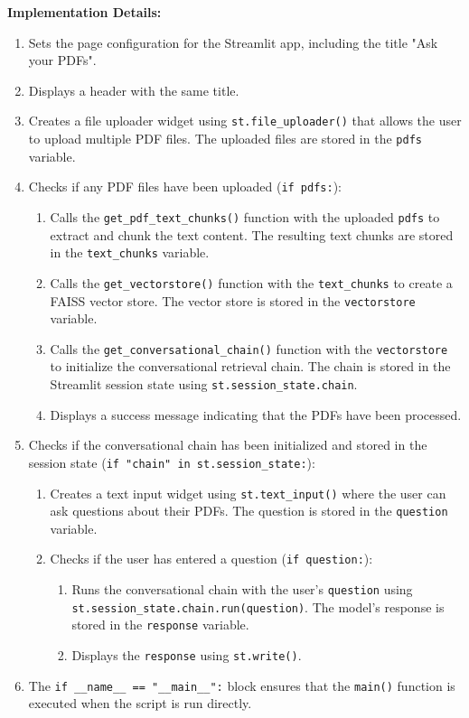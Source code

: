 \documentclass{article}
\begin{document}
\textbf{Implementation Details:}
\begin{enumerate}
    \item Sets the page configuration for the Streamlit app, including the title "Ask your PDFs".
    \item Displays a header with the same title.
    \item Creates a file uploader widget using \texttt{st.file\_uploader()} that allows the user to upload multiple PDF files. The uploaded files are stored in the \texttt{pdfs} variable.
    \item Checks if any PDF files have been uploaded (\texttt{if pdfs:}):
    \begin{enumerate}
        \item Calls the \texttt{get\_pdf\_text\_chunks()} function with the uploaded \texttt{pdfs} to extract and chunk the text content. The resulting text chunks are stored in the \texttt{text\_chunks} variable.
        \item Calls the \texttt{get\_vectorstore()} function with the \texttt{text\_chunks} to create a FAISS vector store. The vector store is stored in the \texttt{vectorstore} variable.
        \item Calls the \texttt{get\_conversational\_chain()} function with the \texttt{vectorstore} to initialize the conversational retrieval chain. The chain is stored in the Streamlit session state using \texttt{st.session\_state.chain}.
        \item Displays a success message indicating that the PDFs have been processed.
    \end{enumerate}
    \item Checks if the conversational chain has been initialized and stored in the session state (\texttt{if "chain" in st.session\_state:}):
    \begin{enumerate}
        \item Creates a text input widget using \texttt{st.text\_input()} where the user can ask questions about their PDFs. The question is stored in the \texttt{question} variable.
        \item Checks if the user has entered a question (\texttt{if question:}):
        \begin{enumerate}
            \item Runs the conversational chain with the user's \texttt{question} using \texttt{st.session\_state.chain.run(question)}. The model's response is stored in the \texttt{response} variable.
            \item Displays the \texttt{response} using \texttt{st.write()}.
        \end{enumerate}
    \end{enumerate}
    \item The \texttt{if \_\_name\_\_ == "\_\_main\_\_":} block ensures that the \texttt{main()} function is executed when the script is run directly.
\end{enumerate}
\end{document}
